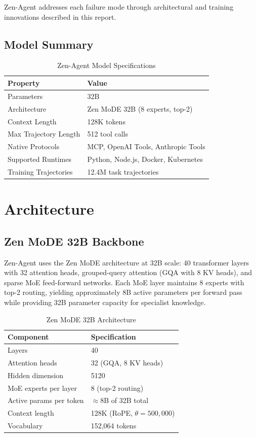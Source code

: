 \documentclass[11pt,a4paper]{article}
\begin{document}
Zen-Agent addresses each failure mode through architectural and training innovations described
in this report.

\subsection{Model Summary}

\begin{table}[H]
\centering
\begin{tabular}{ll}
\toprule
\textbf{Property} & \textbf{Value} \\
\midrule
Parameters & 32B \\
Architecture & Zen MoDE 32B (8 experts, top-2) \\
Context Length & 128K tokens \\
Max Trajectory Length & 512 tool calls \\
Native Protocols & MCP, OpenAI Tools, Anthropic Tools \\
Supported Runtimes & Python, Node.js, Docker, Kubernetes \\
Training Trajectories & 12.4M task trajectories \\
\bottomrule
\end{tabular}
\caption{Zen-Agent Model Specifications}
\end{table}

\section{Architecture}

\subsection{Zen MoDE 32B Backbone}

Zen-Agent uses the Zen MoDE architecture at 32B scale: 40 transformer layers with 32 attention
heads, grouped-query attention (GQA with 8 KV heads), and sparse MoE feed-forward networks.
Each MoE layer maintains 8 experts with top-2 routing, yielding approximately 8B active
parameters per forward pass while providing 32B parameter capacity for specialist knowledge.

\begin{table}[H]
\centering
\begin{tabular}{ll}
\toprule
\textbf{Component} & \textbf{Specification} \\
\midrule
Layers & 40 \\
Attention heads & 32 (GQA, 8 KV heads) \\
Hidden dimension & 5120 \\
MoE experts per layer & 8 (top-2 routing) \\
Active params per token & $\approx$8B of 32B total \\
Context length & 128K (RoPE, $\theta = 500{,}000$) \\
Vocabulary & 152,064 tokens \\
\bottomrule
\end{tabular}
\caption{Zen MoDE 32B Architecture}
\end{table}
\end{document}
